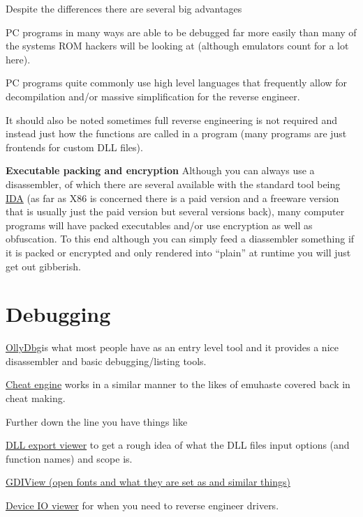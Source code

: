 \documentclass[
]{book}
\begin{document}
Despite the differences there are several big advantages

PC programs in many ways are able to be debugged far more easily than many of the systems ROM hackers will be looking at (although emulators count for a lot here).

PC programs quite commonly use high level languages that frequently allow for decompilation and/or massive simplification for the reverse engineer.

It should also be noted sometimes full reverse engineering is not required and instead just how the functions are called in a program (many programs are just frontends for custom DLL files).

\textbf{Executable packing and encryption} Although you can always use a disassembler, of which there are several available with the standard tool being \href{http://www.hex-rays.com/products/ida/index.shtml}{IDA} (as far as X86 is concerned there is a paid version and a freeware version that is usually just the paid version but several versions back), many computer programs will have packed executables and/or use encryption as well as obfuscation. To this end although you can simply feed a diassembler something if it is packed or encrypted and only rendered into ``plain'' at runtime you will just get out gibberish.

\hypertarget{debugging}{%
\section{Debugging}\label{debugging}}

\href{http://www.ollydbg.de/}{OllyDbg}is what most people have as an entry level tool and it provides a nice disassembler and basic debugging/listing tools.

\href{http://cheatengine.org/}{Cheat engine} works in a similar manner to the likes of emuhaste covered back in cheat making.

Further down the line you have things like

\href{http://www.nirsoft.net/utils/dll_export_viewer.html}{DLL export viewer} to get a rough idea of what the DLL files input options (and function names) and scope is.

\href{http://www.nirsoft.net/utils/gdi_handles.html}{GDIView (open fonts and what they are set as and similar things)}

\href{http://www.nirsoft.net/utils/device_io_view.html}{Device IO viewer} for when you need to reverse engineer drivers.
\end{document}
